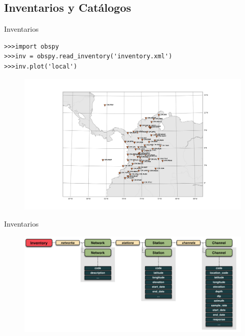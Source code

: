 \documentclass[11pt]{beamer}
\begin{document}
\subsection{Inventarios y Catálogos}

\begin{frame}[fragile]{Inventarios}
\begin{verbatim}
>>>import obspy
>>>inv = obspy.read_inventory('inventory.xml')
>>>inv.plot('local')
\end{verbatim}
\begin{figure}
\begin{center}
\includegraphics[scale=0.15]{inventario.png}
\end{center}
\end{figure}
\end{frame}

\begin{frame}{Inventarios}
\begin{figure}
\includegraphics[scale=0.15]{inv.png}
\end{figure}
\end{frame}
\end{document}
